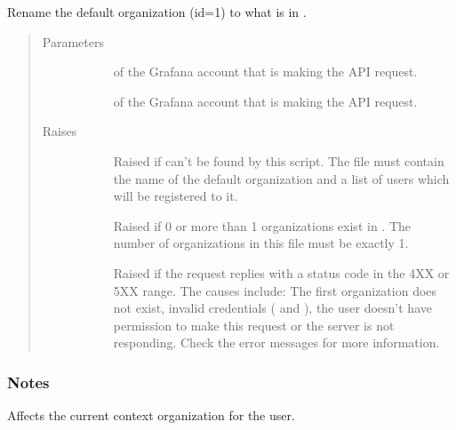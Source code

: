 \documentclass[letterpaper,10pt,english]{sphinxmanual}
\begin{document}
\begin{fulllineitems}
\label{\detokenize{setup:gpSetup.renameKioskOrg}}
Rename the default organization (id=1) to what is in .
\begin{quote}\begin{description}
\item[{Parameters}] \leavevmode\begin{description}
\item[{}] \leavevmode{[}\sphinxtitleref{str}{]}
 of the Grafana account that is making the API request.

\item[{}] \leavevmode{[}\sphinxtitleref{str}{]}
 of the Grafana account that is making the API request.

\end{description}

\item[{Raises}] \leavevmode\begin{description}
\item[{}] \leavevmode
Raised if  can’t be found by this script. The file
must contain the name of the default organization and a list of users which
will be registered to it.

\item[{}] \leavevmode
Raised if 0 or more than 1 organizations exist in .
The number of organizations in this file must be exactly 1.

\item[{}] \leavevmode
Raised if the request replies with a status code in the 4XX or 5XX range.
The causes include: The first organization does not exist, invalid 
credentials ( and ), the user doesn’t have permission to
make this request or the server is not responding. Check the error messages
for more information.

\end{description}

\end{description}\end{quote}




{\hyperref[\detokenize{grafanaAPI:grafanaAPI.request}]{}}


\subsubsection*{Notes}

Affects the current context organization for the user.

\end{fulllineitems}
\end{document}

